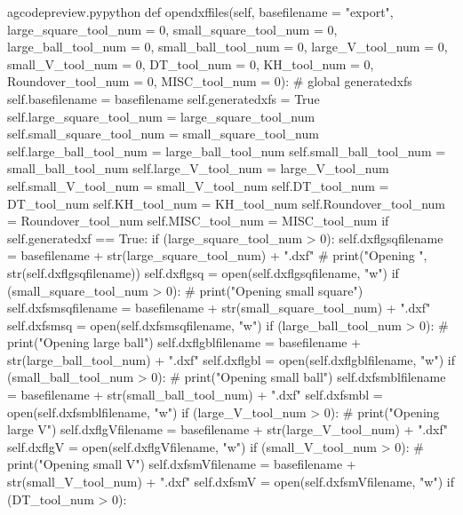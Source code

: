 \documentclass{ltxdoc}
\begin{document}
\begin{writecode}{a}{gcodepreview.py}{python}
    def opendxffiles(self, basefilename = "export", 
                     large_square_tool_num = 0, 
                     small_square_tool_num = 0, 
                     large_ball_tool_num = 0, 
                     small_ball_tool_num = 0, 
                     large_V_tool_num = 0, 
                     small_V_tool_num = 0, 
                     DT_tool_num = 0, 
                     KH_tool_num = 0, 
                     Roundover_tool_num = 0, 
                     MISC_tool_num = 0):
#        global generatedxfs
        self.basefilename = basefilename
        self.generatedxfs = True
        self.large_square_tool_num = large_square_tool_num 
        self.small_square_tool_num = small_square_tool_num
        self.large_ball_tool_num = large_ball_tool_num
        self.small_ball_tool_num = small_ball_tool_num
        self.large_V_tool_num = large_V_tool_num
        self.small_V_tool_num = small_V_tool_num
        self.DT_tool_num = DT_tool_num
        self.KH_tool_num = KH_tool_num
        self.Roundover_tool_num = Roundover_tool_num
        self.MISC_tool_num = MISC_tool_num
        if self.generatedxf == True:
            if (large_square_tool_num > 0):
                self.dxflgsqfilename = basefilename + str(large_square_tool_num) + ".dxf"
#                print("Opening ", str(self.dxflgsqfilename))
                self.dxflgsq = open(self.dxflgsqfilename, "w")
            if (small_square_tool_num > 0):
#                print("Opening small square")
                self.dxfsmsqfilename = basefilename + str(small_square_tool_num) + ".dxf"
                self.dxfsmsq = open(self.dxfsmsqfilename, "w")
            if (large_ball_tool_num > 0):
#                print("Opening large ball")
                self.dxflgblfilename = basefilename + str(large_ball_tool_num) + ".dxf"
                self.dxflgbl = open(self.dxflgblfilename, "w")
            if (small_ball_tool_num > 0):
#                print("Opening small ball")
                self.dxfsmblfilename = basefilename + str(small_ball_tool_num) + ".dxf"
                self.dxfsmbl = open(self.dxfsmblfilename, "w")
            if (large_V_tool_num > 0):
#                print("Opening large V")
                self.dxflgVfilename = basefilename + str(large_V_tool_num) + ".dxf"
                self.dxflgV = open(self.dxflgVfilename, "w")
            if (small_V_tool_num > 0):
#                print("Opening small V")
                self.dxfsmVfilename = basefilename + str(small_V_tool_num) + ".dxf"
                self.dxfsmV = open(self.dxfsmVfilename, "w")
            if (DT_tool_num > 0):

\end{writecode}
\end{document}

